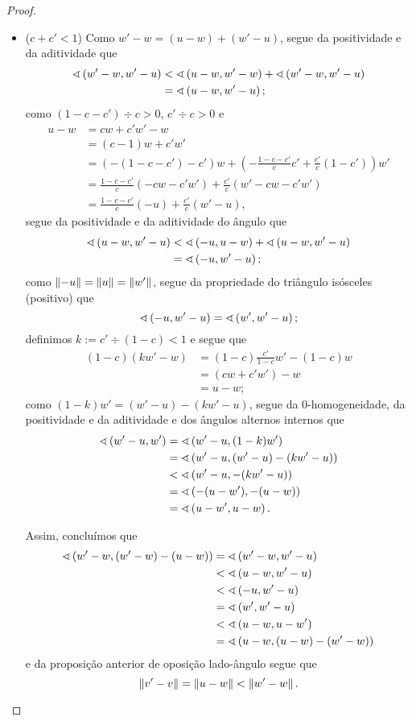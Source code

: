 \begin{proof}
\begin{enumerate}
\begin{itemize}
		\item ($c+c'<1$) Como $w'-w = (u-w) + (w'-u)$, segue da positividade e da aditividade que
			\begin{align*}
			\sphericalangle\left({w'-w},{w'-u}\right) &< \sphericalangle\left({u-w},{w'-w}\right) + \sphericalangle\left({w'-w},{w'-u}\right) \\
				&= \sphericalangle\left({u-w},{w'-u}\right);
			\end{align*}
		como $(1-c-c') \div c > 0$, $c' \div c > 0$ e
			\begin{align*}
			u-w &= cw+c'w'-w \\
				&= (c-1)w + c'w'\\
				&= \left(-(1-c-c')-c' \right)w + \left(-\frac{1-c-c'}{c}c' + \frac{c'}{c}(1-c') \right)w' \\
				&= \frac{1-c-c'}{c}(-cw-c'w') + \frac{c'}{c}(w'-cw-c'w') \\
				&= \frac{1-c-c'}{c}(-u) + \frac{c'}{c}(w'-u),
			\end{align*}
		segue da positividade e da aditividade do ângulo que
			\begin{align*}
			\sphericalangle\left({u-w},{w'-u}\right) &< \sphericalangle\left({-u},{u-w}\right) + \sphericalangle\left({u-w},{w'-u}\right)\\
				&= \sphericalangle\left({-u},{w'-u}\right);
			\end{align*}
		como $\left\Vert{-u}\right\Vert=\left\Vert{u}\right\Vert=\left\Vert{w'}\right\Vert$, segue da propriedade do triângulo isósceles (positivo) que
			\begin{equation*}
			\sphericalangle\left({-u},{w'-u}\right) = \sphericalangle\left({w'},{w'-u}\right);
			\end{equation*}
		definimos $k := c' \div (1-c) < 1$ e segue que
			\begin{align*}
			(1-c)(kw'-w) &= (1-c)\frac{c'}{1-c}w'-(1-c)w \\
				&= (cw+c'w')-w \\
				&= u-w;
			\end{align*}
		como $(1-k)w' = (w'-u)-(kw'-u)$, segue da $0$-homogeneidade, da positividade e da aditividade e dos ângulos alternos internos que
			\begin{align*}
			\sphericalangle\left({w'-u},{w'}\right) &= \sphericalangle\left({w'-u},{(1-k)w'}\right) \\
				&= \sphericalangle\left({w'-u},{(w'-u)-(kw'-u)}\right) \\
				&< \sphericalangle\left({w'-u},{-(kw'-u)}\right) \\
				&= \sphericalangle\left({-(u-w')},{-(u-w)}\right) \\
				&= \sphericalangle\left({u-w'},{u-w}\right).
			\end{align*}

		Assim, concluímos que
			\begin{align*}
			\sphericalangle\left({w'-w},{(w'-w)-(u-w)}\right) &= \sphericalangle\left({w'-w},{w'-u}\right) \\
				&< \sphericalangle\left({u-w},{w'-u}\right) \\
				&< \sphericalangle\left({-u},{w'-u}\right) \\
				&= \sphericalangle\left({w'},{w'-u}\right) \\
				&< \sphericalangle\left({u-w},{u-w'}\right) \\
				&= \sphericalangle\left({u-w},{(u-w)-(w'-w)}\right)
			\end{align*}
		e da proposição anterior de oposição lado-ângulo segue que
			\begin{equation*}
			\left\Vert{v'-v}\right\Vert = \left\Vert{u-w}\right\Vert < \left\Vert{w'-w}\right\Vert.
			\end{equation*}


\end{itemize}
\end{enumerate}
\end{proof}
